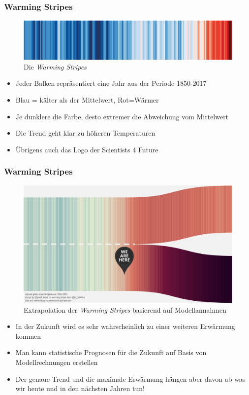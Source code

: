 

\begin{frame}
	\frametitle{Warming Stripes}
	
	\begin{figure}
		\centering
		\includegraphics[width=\linewidth]{bilder/s4f-warming-stripes}
		\caption{Die \textit{Warming Stripes}}
		\label{fig:s4f-warming-stripes}
	\end{figure}
	\begin{itemize}
		\item Jeder Balken repräsentiert eine Jahr aus der Periode 1850-2017
		\item Blau = kälter als der Mittelwert, Rot=Wärmer
		\item Je dunklere die Farbe, desto extremer die Abweichung vom Mittelwert
		\item Die Trend geht klar zu höheren Temperaturen
		\item Übrigens auch das Logo der Scientists 4 Future
	\end{itemize}
\end{frame}

\begin{frame}
	\frametitle{Warming Stripes}
	\begin{figure}
		\centering
		\includegraphics[width=0.55\linewidth]{bilder/warming_stripes_zukunft}
		\caption{Extrapolation der \textit{Warming Stripes} basierend auf Modellannahmen}
	\end{figure}
	\begin{itemize}
		\item In der Zukunft wird es sehr wahrscheinlich zu einer weiteren Erwärmung kommen
		\item Man kann statistische Prognosen für die Zukunft auf Basis von Modellrechnungen erstellen
		\item Der genaue Trend und die maximale Erwärmung hängen aber davon ab was wir heute und in den nächsten Jahren tun!
	\end{itemize}

\end{frame}